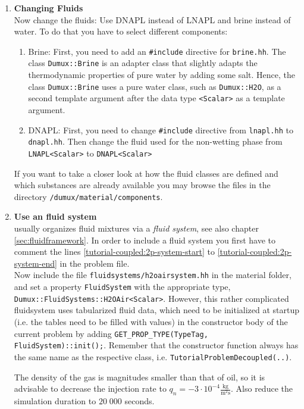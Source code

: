 \begin{enumerate}
\item \textbf{Changing Fluids} \\
Now change the fluids: Use DNAPL instead of LNAPL and brine instead of water. To do that you have to select different components:
\begin{enumerate}
 \item Brine: First, you need to add an \texttt{\#include} directive for \texttt{brine.hh}. The class \texttt{Dumux::Brine} is an adapter class that slightly adapts the thermodynamic properties of pure water by adding some salt. Hence, the class \texttt{Dumux::Brine} uses a pure water class, such as \texttt{Dumux::H2O}, as a second template argument after the data type \texttt{<Scalar>} as a template argument.
 \item DNAPL: First, you need to change \texttt{\#include} directive from \texttt{lnapl.hh} to \texttt{dnapl.hh}. Then change the fluid used for the non-wetting phase from \texttt{LNAPL<Scalar>} to \texttt{DNAPL<Scalar>}
\end{enumerate}
If you want to take a closer look at how the fluid classes are defined and which substances are already available you may browse the files in the directory
\texttt{/dumux/material/components}.

\item \textbf{Use an \eWoms fluid system}\label{dec-ex1-fluidsystem} \\
\eWoms usually organizes fluid mixtures via a \textit{fluid system}, see also chapter \ref{sec:fluidframework}. In order to include a fluid system you first have to comment the lines \ref{tutorial-coupled:2p-system-start} to \ref{tutorial-coupled:2p-system-end} in the problem file.\\

Now include the file \texttt{fluidsystems/h2oairsystem.hh} in the
material folder, and set a property \texttt{FluidSystem} with the
appropriate type,
\texttt{Dumux::FluidSystems::H2OAir<Scalar>}. However, this rather
complicated fluidsystem uses tabularized fluid data, which need to be
initialized at startup (i.e. the tables need to be filled with values)
in the constructor body of the current problem by adding
\texttt{GET\_PROP\_TYPE(TypeTag, FluidSystem)::init();}. Remember that
the constructor function always has the same name as the respective
class, i.e. \texttt{TutorialProblemDecoupled(..)}.

The density of the gas is magnitudes smaller than that of oil, so it
is advisable to decrease the injection rate to $q_n = -3 \cdot 10^{-4}
\frac{\text{kg}}{\text{m}^2 \text{s}}$. Also reduce the simulation
duration to $20\;000$ seconds.


\end{enumerate}
